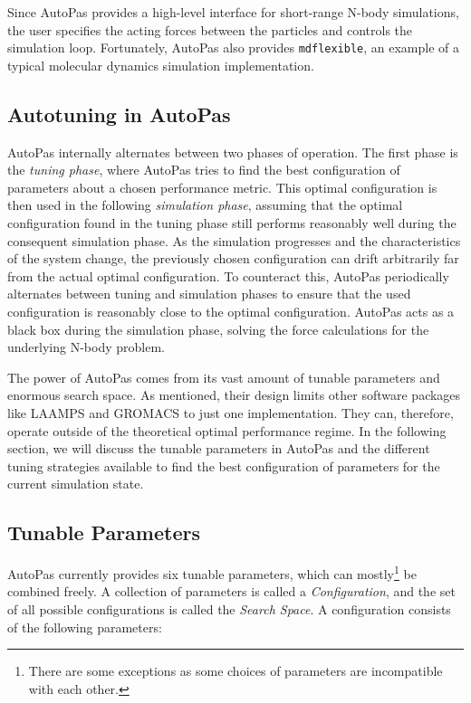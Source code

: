 Since AutoPas provides a high-level interface for short-range N-body simulations, the user specifies the acting forces between the particles and controls the simulation loop. Fortunately, AutoPas also provides \texttt{\gls{mdflexible}}, an example of a typical molecular dynamics simulation implementation.

\subsection{Autotuning in AutoPas}

AutoPas internally alternates between two phases of operation. The first phase is the \emph{tuning phase}, where AutoPas tries to find the best configuration of parameters about a chosen performance metric. This optimal configuration is then used in the following \emph{simulation phase}, assuming that the optimal configuration found in the tuning phase still performs reasonably well during the consequent simulation phase. As the simulation progresses and the characteristics of the system change, the previously chosen configuration can drift arbitrarily far from the actual optimal configuration. To counteract this, AutoPas periodically alternates between tuning and simulation phases to ensure that the used configuration is reasonably close to the optimal configuration.
AutoPas acts as a black box during the simulation phase, solving the force calculations for the underlying N-body problem.


The power of AutoPas comes from its vast amount of tunable parameters and enormous search space. As mentioned, their design limits other software packages like LAAMPS and GROMACS to just one implementation. They can, therefore, operate outside of the theoretical
optimal performance regime. In the following section, we will discuss the tunable parameters in AutoPas and the different tuning strategies available to find the best configuration of parameters for the current simulation state.


\subsection*{Tunable Parameters}

AutoPas currently provides six tunable parameters, which can mostly\footnote{There are some exceptions as some choices of parameters are incompatible with each other.} be combined freely. A collection of parameters is called a \emph{Configuration}, and the set of all possible configurations is called the \emph{Search Space}. A configuration consists of the following parameters:

